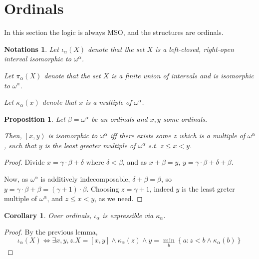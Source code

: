 \documentclass{article}
\newtheorem{corollary}{Corollary}
\newtheorem{proposition}{Proposition}
\newtheorem{notations}{Notations}
\newcommand{\parens}[1]{\left( {#1} \right)}
\newcommand{\brackets}[1]{\left[ {#1} \right]}
\newcommand{\braces}[1]{\left\{ {#1} \right\}}
\newcommand{\iv}[1]{\left[ #1 \right)}
\newcommand{\setcomp}[1]{\braces{#1}}
\newcommand{\ii}[1]{{\iota}_{#1}}
\newcommand{\kk}[1]{{\kappa}_{#1}}
\newcommand{\pp}[1]{{\pi}_{#1}}
\begin{document}
\section{Ordinals}

In this section the logic is always MSO, and the structures are ordinals.

\begin{notations}
    Let $\ii{\alpha} \parens{X}$ denote
    that the set $X$ is a left-closed, right-open interval isomorphic to $\omega^\alpha$.

    Let $\pp{\alpha} \parens{X}$ denote
    that the set $X$ is a finite union of intervals and is isomorphic to $\omega^\alpha$.

    Let $\kk{\alpha} \parens{x}$ denote
    that $x$ is a multiple of $\omega^\alpha$.
\end{notations}


\begin{proposition}
    Let $\beta = \omega^\alpha$ be an ordinals
    and $x, y$ some ordinals.

    Then,
    $\iv{x, y}$ is isomorphic to $\omega^\alpha$
    iff there exists some $z$ which is a multiple of $\omega^\alpha$,
    such that $y$ is the least greater multiple of $\omega^\alpha$ s.t. $z \le x < y$.
\end{proposition}

\begin{proof}
    Divide $x = \gamma \cdot \beta + \delta$ where $\delta < \beta$, and as $x + \beta = y$,
    $y = \gamma \cdot \beta + \delta + \beta$.

    Now, as $\omega^\alpha$ is additively indecomposable, $\delta + \beta = \beta$,
    so $y = \gamma \cdot \beta + \beta = \parens{\gamma + 1} \cdot \beta$.
    Choosing $z = \gamma + 1$, indeed $y$ is the least greter multiple of $\omega^\alpha$,
    and $z \le x < y$, as we need.
\end{proof}

\begin{corollary}
    Over ordinals, $\ii{\alpha}$ is expressible via $\kk{\alpha}$.
\end{corollary}

\begin{proof}
    By the previous lemma,
    $$\ii{\alpha} \parens{X}
    \iff
    \exists x, y, z. 
           X = \brackets{x, y}
    \wedge \kk{\alpha} \parens{z}
    \wedge y = \min_b \setcomp{a : z < b \wedge \kk{\alpha} \parens{b}}$$
\end{proof}
\end{document}
